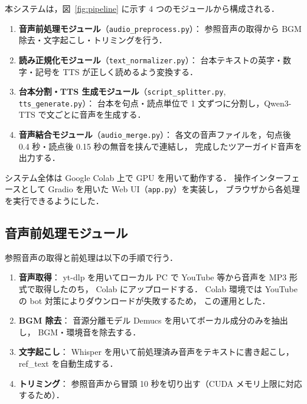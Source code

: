 \documentclass[uplatex,a4paper,10pt,twocolumn]{jsarticle}
\begin{document}
本システムは，図~\ref{fig:pipeline} に示す 4 つのモジュールから構成される．

\begin{enumerate}
  \item \textbf{音声前処理モジュール}（\texttt{audio\_preprocess.py}）：
    参照音声の取得から BGM 除去・文字起こし・トリミングを行う．
  \item \textbf{読み正規化モジュール}（\texttt{text\_normalizer.py}）：
    台本テキストの英字・数字・記号を TTS が正しく読めるよう変換する．
  \item \textbf{台本分割・TTS 生成モジュール}（\texttt{script\_splitter.py}, \texttt{tts\_generate.py}）：
    台本を句点・読点単位で 1 文ずつに分割し，Qwen3-TTS で文ごとに音声を生成する．
  \item \textbf{音声結合モジュール}（\texttt{audio\_merge.py}）：
    各文の音声ファイルを，句点後 0.4 秒・読点後 0.15 秒の無音を挟んで連結し，
    完成したツアーガイド音声を出力する．
\end{enumerate}

システム全体は Google Colab 上で GPU を用いて動作する．
操作インターフェースとして Gradio を用いた Web UI（\texttt{app.py}）を実装し，
ブラウザから各処理を実行できるようにした．


\subsection{音声前処理モジュール}

参照音声の取得と前処理は以下の手順で行う．

\begin{enumerate}
  \item \textbf{音声取得}：
    yt-dlp を用いてローカル PC で YouTube 等から音声を MP3 形式で取得したのち，
    Colab にアップロードする．
    Colab 環境では YouTube の bot 対策によりダウンロードが失敗するため，
    この運用とした．
  \item \textbf{BGM 除去}：
    音源分離モデル Demucs を用いてボーカル成分のみを抽出し，
    BGM・環境音を除去する．
  \item \textbf{文字起こし}：
    Whisper を用いて前処理済み音声をテキストに書き起こし，
    ref\_text を自動生成する．
  \item \textbf{トリミング}：
    参照音声から冒頭 10 秒を切り出す（CUDA メモリ上限に対応するため）．
\end{enumerate}
\end{document}
